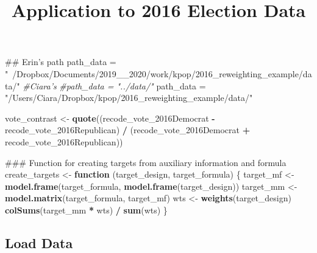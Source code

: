 \documentclass[]{article}
\title{Application to 2016 Election Data}
\author{}
\date{}
\newenvironment{Shaded}{\begin{snugshade}}{\end{snugshade}}
\newcommand{\CommentTok}[1]{\textcolor[rgb]{0.56,0.35,0.01}{\textit{#1}}}
\newcommand{\ControlFlowTok}[1]{\textcolor[rgb]{0.13,0.29,0.53}{\textbf{#1}}}
\newcommand{\KeywordTok}[1]{\textcolor[rgb]{0.13,0.29,0.53}{\textbf{#1}}}
\newcommand{\NormalTok}[1]{#1}
\newcommand{\OperatorTok}[1]{\textcolor[rgb]{0.81,0.36,0.00}{\textbf{#1}}}
\newcommand{\StringTok}[1]{\textcolor[rgb]{0.31,0.60,0.02}{#1}}
\begin{document}
\maketitle

\begin{Shaded}
\begin{Highlighting}[]
\NormalTok{## Erin's path}
\NormalTok{path_data =}\StringTok{ "~/Dropbox/Documents/2019__2020/work/kpop/2016_reweighting_example/data/"}
\CommentTok{#Ciara's }
\CommentTok{#path_data = "../data/"}
\NormalTok{path_data =}\StringTok{ "/Users/Ciara/Dropbox/kpop/2016_reweighting_example/data/"}
\end{Highlighting}
\end{Shaded}

\begin{Shaded}
\begin{Highlighting}[]
\NormalTok{vote_contrast <-}\StringTok{ }\KeywordTok{quote}\NormalTok{((recode_vote_2016Democrat }\OperatorTok{-}\StringTok{ }\NormalTok{recode_vote_2016Republican) }\OperatorTok{/}
\StringTok{                           }\NormalTok{(recode_vote_2016Democrat }\OperatorTok{+}\StringTok{ }\NormalTok{recode_vote_2016Republican))}

\NormalTok{### Function for creating targets from auxiliary information and formula}
\NormalTok{create_targets <-}\StringTok{ }\ControlFlowTok{function}\NormalTok{ (target_design, target_formula) \{}
\NormalTok{    target_mf <-}\StringTok{ }\KeywordTok{model.frame}\NormalTok{(target_formula, }\KeywordTok{model.frame}\NormalTok{(target_design))}
\NormalTok{    target_mm <-}\StringTok{ }\KeywordTok{model.matrix}\NormalTok{(target_formula, target_mf)}
\NormalTok{    wts <-}\StringTok{ }\KeywordTok{weights}\NormalTok{(target_design)}
    \KeywordTok{colSums}\NormalTok{(target_mm }\OperatorTok{*}\StringTok{ }\NormalTok{wts) }\OperatorTok{/}\StringTok{ }\KeywordTok{sum}\NormalTok{(wts)}
\NormalTok{\}}
\end{Highlighting}
\end{Shaded}

\hypertarget{load-data}{%
\subsection{Load Data}\label{load-data}}
\end{document}

